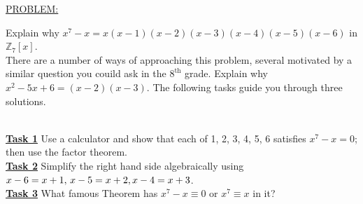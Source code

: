 \documentclass[12pt, fleqn, twoside]{book}
\begin{document}
\underline{PROBLEM:} \parbox[t]{5.5in}{Explain why $x^7 -x = x(x-1)(x-2)(x-3)(x-4)(x-5)(x-6)$ in $\mathbb{Z}_7[x]$.\\[.25in]
There are a number of ways of approaching this problem, several motivated by a similar question you couild ask in the $8^\text{th}$ grade.  Explain why $x^2-5x+6=(x-2)(x-3)$.  The following tasks guide you through three solutions.}\\[.25in]
\underline{\bf{Task 1}} Use a calculator and show that each of 1, 2, 3, 4, 5, 6 satisfies $x^7-x=0$; then use the factor theorem.\\ \vfill
\underline{\bf{Task 2}} Simplify the right hand side algebraically using $x-6=x+1,\, x-5=x+2,\,\\ x-4=x+3$.\\ \vfill
\underline{\bf{Task 3}} What famous Theorem has $x^7-x\equiv 0$ or $x^7\equiv x$ in it?\\ \vfill
\end{document}

